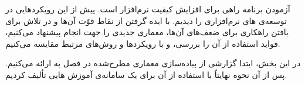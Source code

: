 
آزمودن برنامه راهی برای افزایش کیفیت نرم‌افزار است. پیش از این رویکردهایی در توسعه‌ی های نرم‌افزاری را دیدیم. با ایده گرفتن از نقاط قوّت آن‌ها و در تلاش برای یافتن راهکاری برای ضعف‌های آن‌ها، معماری جدیدی را جهت انجام  پیشنهاد می‌کنیم، فواید استفاده از آن را بررسی، و با رویکردها و روش‌های مرتبط مقایسه می‌کنیم.









در این بخش، ابتدا گزارشی از پیاده‌سازی معماری مطرح‌شده در فصل  به  ارائه می‌کنیم. پس از آن نحوه
نهایتاً با استفاده از آن برای یک سامانه‌ی آموزش هایی تألیف کردیم.




